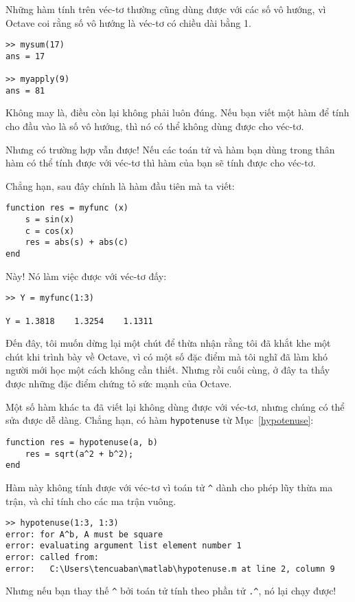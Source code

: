 \documentclass[12pt]{book}
\begin{document}
Những hàm tính trên véc-tơ thường cũng dùng được với các số
vô hướng, vì Octave coi rằng số vô hướng là véc-tơ có chiều dài
bằng 1.

\begin{verbatim}
>> mysum(17)
ans = 17

>> myapply(9)
ans = 81
\end{verbatim}

Không may là, điều còn lại không phải luôn đúng. Nếu bạn viết
một hàm để tính cho đầu vào là số vô hướng, thì nó có thể không
dùng được cho véc-tơ.

Nhưng có trường hợp vẫn được! Nếu các toán tử và hàm bạn dùng
trong thân hàm có thể tính được với véc-tơ thì hàm của bạn sẽ
tính được cho véc-tơ.

Chẳng hạn, sau đây chính là hàm đầu tiên mà ta viết:

\begin{verbatim}
function res = myfunc (x)
    s = sin(x)
    c = cos(x)
    res = abs(s) + abs(c)
end
\end{verbatim}
%
Này! Nó làm việc được với véc-tơ đấy:

\begin{verbatim}
>> Y = myfunc(1:3)

Y = 1.3818    1.3254    1.1311
\end{verbatim}
%
Đến đây, tôi muốn dừng lại một chút để thừa nhận rằng tôi đã
khắt khe một chút khi trình bày về Octave, vì có một số 
đặc điểm mà tôi nghĩ đã làm khó người mới học một cách
không cần thiết. Nhưng rồi cuối cùng, ở đây ta thấy được 
những đặc điểm chứng tỏ sức mạnh của Octave.

Một số hàm khác ta đã viết lại không dùng được với véc-tơ, nhưng
chúng có thể sửa được dễ dàng. Chẳng hạn, có hàm 
{\tt hypotenuse} từ Mục~\ref{hypotenuse}:

\begin{verbatim}
function res = hypotenuse(a, b)
    res = sqrt(a^2 + b^2);
end
\end{verbatim}
%
Hàm này không tính được với véc-tơ vì toán tử \verb+^+ 
dành cho phép lũy thừa ma trận, và chỉ tính cho các ma trận
vuông.

\begin{verbatim}
>> hypotenuse(1:3, 1:3)
error: for A^b, A must be square
error: evaluating argument list element number 1
error: called from:
error:   C:\Users\tencuaban\matlab\hypotenuse.m at line 2, column 9
\end{verbatim}
%
Nhưng nếu bạn thay thế \verb+^+ bởi toán tử tính theo phần tử
\verb+.^+, nó lại chạy được!
\end{document}
